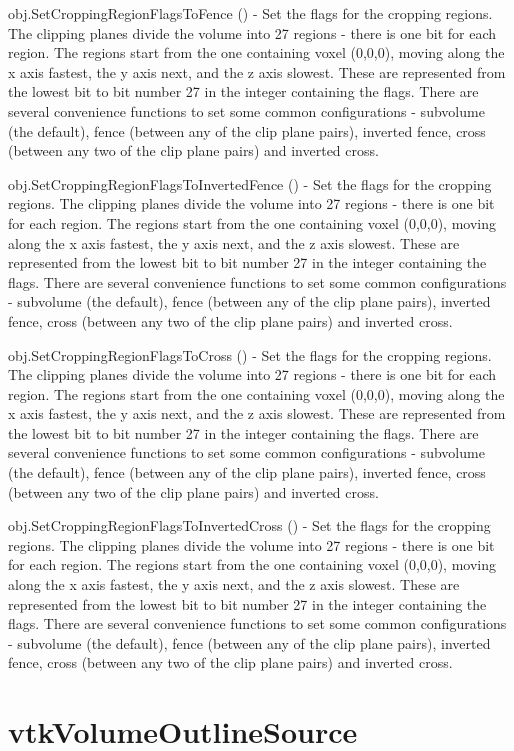 \begin{DoxyItemize}
\item {\ttfamily obj.\-Set\-Cropping\-Region\-Flags\-To\-Fence ()} -\/ Set the flags for the cropping regions. The clipping planes divide the volume into 27 regions -\/ there is one bit for each region. The regions start from the one containing voxel (0,0,0), moving along the x axis fastest, the y axis next, and the z axis slowest. These are represented from the lowest bit to bit number 27 in the integer containing the flags. There are several convenience functions to set some common configurations -\/ subvolume (the default), fence (between any of the clip plane pairs), inverted fence, cross (between any two of the clip plane pairs) and inverted cross.  
\item {\ttfamily obj.\-Set\-Cropping\-Region\-Flags\-To\-Inverted\-Fence ()} -\/ Set the flags for the cropping regions. The clipping planes divide the volume into 27 regions -\/ there is one bit for each region. The regions start from the one containing voxel (0,0,0), moving along the x axis fastest, the y axis next, and the z axis slowest. These are represented from the lowest bit to bit number 27 in the integer containing the flags. There are several convenience functions to set some common configurations -\/ subvolume (the default), fence (between any of the clip plane pairs), inverted fence, cross (between any two of the clip plane pairs) and inverted cross.  
\item {\ttfamily obj.\-Set\-Cropping\-Region\-Flags\-To\-Cross ()} -\/ Set the flags for the cropping regions. The clipping planes divide the volume into 27 regions -\/ there is one bit for each region. The regions start from the one containing voxel (0,0,0), moving along the x axis fastest, the y axis next, and the z axis slowest. These are represented from the lowest bit to bit number 27 in the integer containing the flags. There are several convenience functions to set some common configurations -\/ subvolume (the default), fence (between any of the clip plane pairs), inverted fence, cross (between any two of the clip plane pairs) and inverted cross.  
\item {\ttfamily obj.\-Set\-Cropping\-Region\-Flags\-To\-Inverted\-Cross ()} -\/ Set the flags for the cropping regions. The clipping planes divide the volume into 27 regions -\/ there is one bit for each region. The regions start from the one containing voxel (0,0,0), moving along the x axis fastest, the y axis next, and the z axis slowest. These are represented from the lowest bit to bit number 27 in the integer containing the flags. There are several convenience functions to set some common configurations -\/ subvolume (the default), fence (between any of the clip plane pairs), inverted fence, cross (between any two of the clip plane pairs) and inverted cross.  
\end{DoxyItemize}\hypertarget{vtkvolumerendering_vtkvolumeoutlinesource}{}\section{vtk\-Volume\-Outline\-Source}\label{vtkvolumerendering_vtkvolumeoutlinesource}
